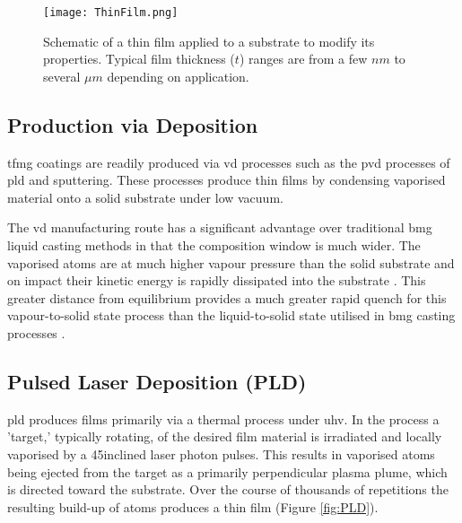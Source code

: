 \documentclass[a4paper,12pt,oneside]{report}%
\begin{document}
\begin{figure}[htbp]
	\centering
	\texttt{[image: ThinFilm.png]}
	\caption[Schematic of a thin film applied to a substrate to modify its properties. Typical film thickness ($t$) ranges are from a few $nm$ to several $\mu m$ depending on application.]{Schematic of a thin film applied to a substrate to modify its properties. Typical film thickness ($t$) ranges are from a few $nm$ to several $\mu m$ depending on application.}
	\label{fig:ThinFilm}
\end{figure}

\subsection{Production via Deposition}
\Gls{tfmg} coatings are readily produced via \gls{vd} processes such as the \gls{pvd} processes of \gls{pld} and sputtering. These processes produce thin films by condensing vaporised material onto a solid substrate under low vacuum. 

The \gls{vd} manufacturing route has a significant advantage over traditional \gls{bmg} liquid casting methods in that the composition window is much wider. The vaporised atoms are at much higher vapour pressure than the solid substrate and on impact their kinetic energy is rapidly dissipated into the substrate \cite{Ishii2014}. This greater distance from equilibrium provides a much greater rapid quench for this vapour-to-solid state process than the liquid-to-solid state utilised in \gls{bmg} casting processes \cite{Chu2012b}. 

\subsection{Pulsed Laser Deposition (PLD)}
\Acrfull{pld} produces films primarily via a thermal process under \gls{uhv}. In the process a 'target,' typically rotating, of the desired film material is irradiated and locally vaporised by a 45\degree inclined laser photon pulses. This results in vaporised atoms being ejected from the target as a primarily perpendicular plasma plume, which is directed toward the substrate. Over the course of thousands of repetitions the resulting build-up of atoms produces a thin film (Figure \ref{fig:PLD}). 
\end{document}
